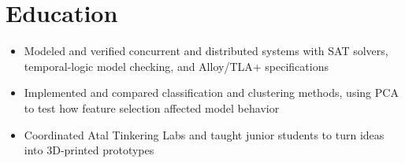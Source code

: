 
\titlespacing{\section}{0pt}{7pt}{3pt}

\section{Education}
\begin{itemize}
  \item Modeled and verified concurrent and distributed systems with SAT solvers, temporal-logic model checking, and Alloy/TLA+ specifications
  \item Implemented and compared classification and clustering methods, using PCA to test how feature selection affected model behavior
\end{itemize}
\begin{itemize}
  \item Coordinated Atal Tinkering Labs and taught junior students to turn ideas into 3D-printed prototypes
\end{itemize}
